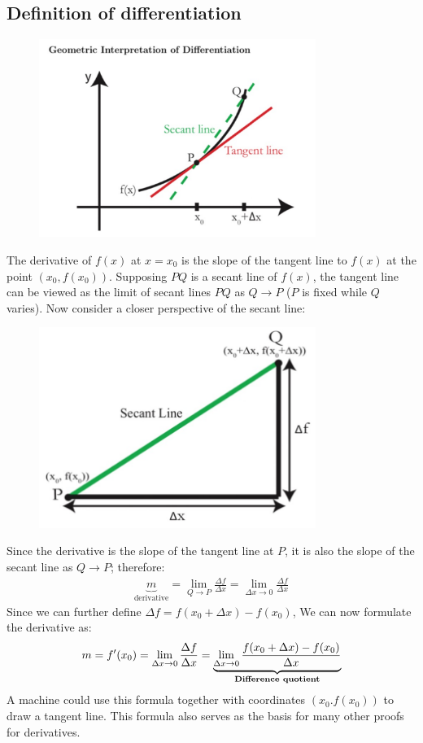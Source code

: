 \documentclass{report}
\begin{document}
\subsection{Definition of differentiation} 
\label{fundamentals:differentiation:definition}
\begin{figure}[h]
\includegraphics[width=9cm]{Capture}
\centering
\end{figure}
\noindent The derivative of $f(x)$ at $x=x_0$ is the slope of the tangent line to $f(x)$ at the
point $(x_0,f(x_0))$. Supposing $PQ$ is a secant line of $f(x)$, the tangent line can be viewed
as the limit of secant lines $PQ$ as $Q\to P$ ($P$ is fixed while $Q$ varies).
\newpage
\noindent Now consider a closer perspective of the secant line:
\begin{figure}[h]
\includegraphics[width=9cm]{Capture2}
\centering
\end{figure}
Since the derivative is the slope of the tangent line at $P$, it is also the slope of the secant
line as $Q\to P$; therefore:
\begin{align*}
\underbrace{m}_{\text{derivative}}=\lim_{Q\to P}\frac{\Delta f}{\Delta x}
=\lim_{\Delta x\to 0}\frac{\Delta f}{\Delta x}
\end{align*}
Since we can further define $\Delta f=f(x_0+\Delta x)-f(x_0)$, We can now formulate the derivative as:
\begin{align*}
m=f'(x_0)=\lim_{\Delta x\to 0}\frac{\Delta f}{\Delta x}
=\underbrace{\lim_{\Delta x\to 0}\frac{f(x_0+\Delta x)-f(x_0)}{\Delta x}}
_{\text{\textbf{Difference quotient}}}
\end{align*}
A machine could use this formula together with coordinates $(x_0.f(x_0))$ to draw a tangent line.
This formula also serves as the basis for many other proofs for derivatives.
\newpage
\end{document}
